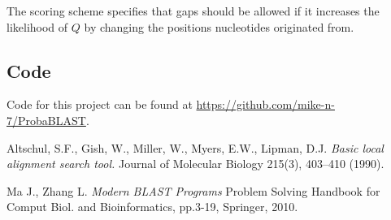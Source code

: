 \documentclass[11pt]{IEEEtran}
\begin{document}
The scoring scheme specifies that gaps should be allowed if it increases the likelihood of $Q$ by changing the positions nucleotides originated from.

\subsection{Code}
Code for this project can be found at \url{https://github.com/mike-n-7/ProbaBLAST}.

\begin{thebibliography}{9}

Altschul, S.F., Gish, W., Miller, W., Myers, E.W., Lipman, D.J. 
\emph{Basic local alignment search tool. }
Journal of Molecular Biology 215(3), 403–410 (1990).

Ma J., Zhang L.
\emph{Modern BLAST Programs}
Problem Solving Handbook for Comput Biol. and Bioinformatics, pp.3-19, Springer, 2010.


\end{thebibliography}
\end{document}

